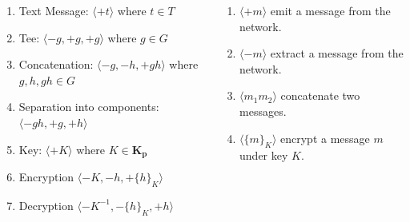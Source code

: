 \begin{columns}
\pause
\begin{enumerate}
\item[M.] Text Message: \( \langle +t \rangle \) where \(t \in T\)

\item[T.] Tee: \( \langle -g, +g, +g \rangle \) where \(g \in G\)

\item[C.] Concatenation: \( \langle -g, -h, +gh \rangle \) where \(g,h, gh \in G\)

\item[S.] Separation into components: \( \langle -gh, +g, +h \rangle \)

\item[K.] Key: \( \langle +K \rangle \) where \(K \in \mathbf{K_p}\)

\item[E.] Encryption \( \langle -K, -h, +\{h\}_K \rangle \)

\item[D.] Decryption \( \langle -K^{-1}, -\{h\}_K, +h \rangle \)
\end{enumerate}


\begin{enumerate}
\item \(\langle +m \rangle\) emit a message from the network.

\item \(\langle -m \rangle\) extract a message from the network.

\item \(\langle m_1m_2 \rangle\) concatenate two messages.

\item \(\langle \{m\}_K \rangle\) encrypt a message \(m\) under key \(K\).
\end{enumerate}
\end{columns}